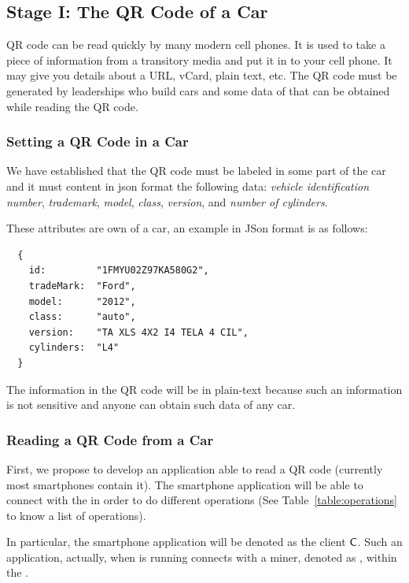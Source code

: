 \subsection{Stage I: The QR Code of a Car}

QR code can be read quickly by many modern cell phones. It is used to take a piece of information from a 
transitory media and put it in to your cell phone. It may give you details about a URL, vCard, plain text, etc.
The QR code must be generated by leaderships who build cars and some data of that
can be obtained while reading the QR code.

\subsubsection{Setting a QR Code in a Car}
\label{sssec:settingQR}
We have established that the QR code must be labeled in some part of the car and it must content in json format 
the following data: 
\textit{vehicle identification number}, 
\textit{trademark}, 
\textit{model}, 
\textit{class}, 
\textit{version}, and
\textit{number of cylinders}.

These attributes are own of a car, an example in JSon format is as follows:
\begin{lstlisting}
  {
    id:         "1FMYU02Z97KA580G2", 
    tradeMark:  "Ford", 
    model:      "2012", 
    class:      "auto", 
    version:    "TA XLS 4X2 I4 TELA 4 CIL", 
    cylinders:  "L4"
  }
\end{lstlisting}

The information in the QR code will be in plain-text because such an information is not sensitive and anyone 
can obtain such data of any car.


\subsubsection{Reading a QR Code from a Car}
\label{sssec:readingQR}

First, we propose to develop an application able to read a QR code (currently most smartphones contain it).
The smartphone application will be able to connect with the \blockchaincarnetwork in order to do different 
operations (See Table~\ref{table:operations} to know a list of operations). 

In particular, the smartphone application will be denoted as the client $\textsf{C}$. Such an application, 
actually, when is running connects with a miner, denoted as \Server, within the \blockchaincarnetwork.

